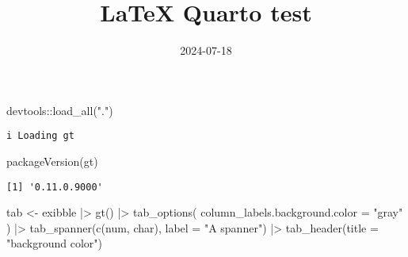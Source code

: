 \documentclass[
  letterpaper,
  DIV=11,
  numbers=noendperiod]{scrartcl}
\title{LaTeX Quarto test}
\author{}
\date{2024-07-18}
\newenvironment{Shaded}{\begin{snugshade}}{\end{snugshade}}
\newcommand{\AttributeTok}[1]{\textcolor[rgb]{0.40,0.45,0.13}{#1}}
\newcommand{\FunctionTok}[1]{\textcolor[rgb]{0.28,0.35,0.67}{#1}}
\newcommand{\NormalTok}[1]{\textcolor[rgb]{0.00,0.23,0.31}{#1}}
\newcommand{\OtherTok}[1]{\textcolor[rgb]{0.00,0.23,0.31}{#1}}
\newcommand{\SpecialCharTok}[1]{\textcolor[rgb]{0.37,0.37,0.37}{#1}}
\newcommand{\StringTok}[1]{\textcolor[rgb]{0.13,0.47,0.30}{#1}}
\begin{document}
\maketitle

\listoftables
\begin{Shaded}
\begin{Highlighting}[]
\NormalTok{devtools}\SpecialCharTok{::}\FunctionTok{load\_all}\NormalTok{(}\StringTok{"."}\NormalTok{)}
\end{Highlighting}
\end{Shaded}

\begin{verbatim}
i Loading gt
\end{verbatim}

\begin{Shaded}
\begin{Highlighting}[]
\FunctionTok{packageVersion}\NormalTok{(}\StringTok{\textquotesingle{}gt\textquotesingle{}}\NormalTok{)}
\end{Highlighting}
\end{Shaded}

\begin{verbatim}
[1] '0.11.0.9000'
\end{verbatim}

\newpage{}

\begin{Shaded}
\begin{Highlighting}[]
\NormalTok{tab }\OtherTok{\textless{}{-}}\NormalTok{ exibble }\SpecialCharTok{|\textgreater{}}
  \FunctionTok{gt}\NormalTok{() }\SpecialCharTok{|\textgreater{}}
  \FunctionTok{tab\_options}\NormalTok{(}
    \AttributeTok{column\_labels.background.color =} \StringTok{"gray"}
\NormalTok{  ) }\SpecialCharTok{|\textgreater{}}
  \FunctionTok{tab\_spanner}\NormalTok{(}\FunctionTok{c}\NormalTok{(num, char), }\AttributeTok{label =} \StringTok{"A spanner"}\NormalTok{) }\SpecialCharTok{|\textgreater{}}
  \FunctionTok{tab\_header}\NormalTok{(}\AttributeTok{title =} \StringTok{"background color"}\NormalTok{)}
\end{Highlighting}
\end{Shaded}
\end{document}
